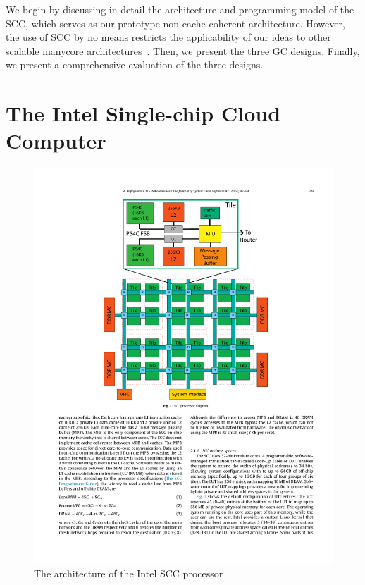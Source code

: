 We begin by discussing in detail the architecture and programming model of the
SCC, which serves as our prototype non cache coherent architecture. However,
the use of SCC by no means restricts the applicability of our ideas to other
scalable manycore architectures~\cite{mmgc}. Then, we present the three GC
designs. Finally, we present a comprehensive evaluation of the three designs.

\section{The Intel Single-chip Cloud Computer}

\begin{figure}[t]
\begin{center}
\includegraphics{Figures/SCC.pdf}
\end{center}
\caption{The architecture of the Intel SCC processor}
\label{fig:scc}
\end{figure}

